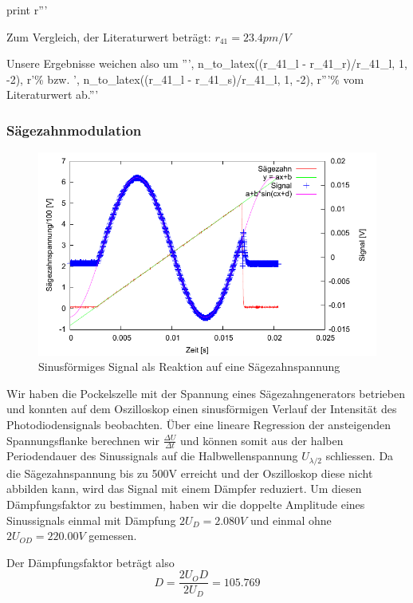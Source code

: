 \begin{python}
\begin{center}
{{print r'''}}
\end{center}


Zum Vergleich, der Literaturwert betr\"agt: $r_{41} = 23.4 pm/V$

Unsere Ergebnisse weichen also um ''', n_to_latex((r_41_l - r_41_r)/r_41_l, 1, -2), r'\% bzw. ', n_to_latex((r_41_l - r_41_s)/r_41_l, 1, -2), r'''\% vom Literaturwert ab.'''

\end{python}


\subsubsection{Sägezahnmodulation}

\begin{figure}[H]
 \centering
 \includegraphics{messwerte/saegezahn/saegezahn_1.pdf}
 \caption{Sinusförmiges Signal als Reaktion auf eine Sägezahnspannung}
\end{figure}

Wir haben die Pockelszelle mit der Spannung eines Sägezahngenerators betrieben und konnten auf dem Oszilloskop einen sinusförmigen Verlauf der Intensität des Photodiodensignals beobachten. Über eine lineare Regression der ansteigenden Spannungsflanke berechnen wir $\frac{\Delta U}{\Delta t}$ und können somit aus der halben Periodendauer des Sinussignals auf die Halbwellenspannung $U_{\lambda/2}$ schliessen. Da die Sägezahnspannung bis zu 500V erreicht und der Oszilloskop diese nicht abbilden kann, wird das Signal mit einem Dämpfer reduziert. Um diesen Dämpfungsfaktor zu bestimmen, haben wir die doppelte Amplitude eines Sinussignals einmal mit Dämpfung $2U_D = 2.080V$ und einmal ohne $2U_{OD} = 220.00V$ gemessen.

Der Dämpfungsfaktor beträgt also
$$ D = \frac{2U_OD}{2U_{D}} = 105.769 $$

